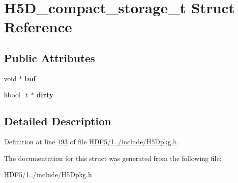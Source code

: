\hypertarget{struct_h5_d__compact__storage__t}{}\section{H5\+D\+\_\+compact\+\_\+storage\+\_\+t Struct Reference}
\label{struct_h5_d__compact__storage__t}
\subsection*{Public Attributes}
\begin{DoxyCompactItemize}
\item 
\mbox{\label{struct_h5_d__compact__storage__t_adb8164a704cee9538603938e47334c1f}} 
void $\ast$ {\bfseries buf}
\item 
\mbox{\label{struct_h5_d__compact__storage__t_a4c0053dd75202103fe0429861b438378}} 
hbool\+\_\+t $\ast$ {\bfseries dirty}
\end{DoxyCompactItemize}


\subsection{Detailed Description}


Definition at line \hyperlink{_h_d_f5_21_810_81_2include_2_h5_dpkg_8h_source_l00193}{193} of file \hyperlink{_h_d_f5_21_810_81_2include_2_h5_dpkg_8h_source}{H\+D\+F5/1../include/\+H5\+Dpkg.\+h}.



The documentation for this struct was generated from the following file\+:\begin{DoxyCompactItemize}
\item 
H\+D\+F5/1../include/\+H5\+Dpkg.\+h\end{DoxyCompactItemize}
